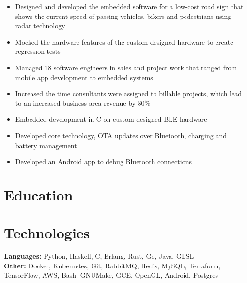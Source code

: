 \documentclass{cv_doc}
\begin{document}

\begin{itemize}[label={\tiny\raisebox{1ex}{\textbullet}}]
  \item {Designed and developed the embedded software for a low-cost road sign
  that shows the current speed of passing vehicles, bikers and pedestrians
  using radar technology}
  \item {Mocked the hardware features of the custom-designed hardware to create
  regression tests}
\end{itemize}


\begin{itemize}[label={\tiny\raisebox{1ex}{\textbullet}}]
  \item {Managed 18 software engineers in sales and project work that ranged
  from mobile app development to embedded systems}
  \item {Increased the time consultants were assigned to billable projects,
  which lead to an increased business area revenue by 80\%}
\end{itemize}


\begin{itemize}[label={\tiny\raisebox{1ex}{\textbullet}}]
  \item {Embedded development in C on custom-designed BLE hardware}
  \item {Developed core technology, OTA updates over Bluetooth, charging
  and battery management}
  \item {Developed an Android app to debug Bluetooth connections}
\end{itemize}

\vspace{0.3cm}

\section*{Education}


\vspace{0.3cm}

\section*{Technologies}

\textbf{Languages:} Python, Haskell, C, Erlang, Rust, Go, Java, GLSL \\
\textbf{Other:} Docker, Kubernetes, Git, RabbitMQ, Redis, MySQL, Terraform, TensorFlow, AWS, Bash, GNUMake, GCE, OpenGL,
Android, Postgres
\end{document}
